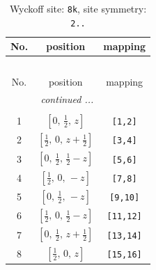 \documentclass[fleqn,8pt]{jsarticle}
\begin{document}
\renewcommand{\arraystretch}{1.2}
\begin{longtable}{ccc}
\caption{Wyckoff site: {\tt 8k}, site symmetry: {\tt 2..}}
 \\
 \hline \hline
No. & position & mapping \\ \hline \endfirsthead

\multicolumn{2}{l}{\tablename\ \thetable{}} \\
 \hline \hline
No. & position & mapping \\ \hline \endhead

 \hline \hline
\multicolumn{2}{r}{\footnotesize\it continued ...} \\ \endfoot

 \hline \hline
\multicolumn{2}{r}{} \\ \endlastfoot

1 & $\left[ 0,\, \frac{1}{2},\, z \right]$ & {\tt [1,2]} \\ \hline
2 & $\left[ \frac{1}{2},\, 0,\, z + \frac{1}{2} \right]$ & {\tt [3,4]} \\ \hline
3 & $\left[ 0,\, \frac{1}{2},\, \frac{1}{2} - z \right]$ & {\tt [5,6]} \\ \hline
4 & $\left[ \frac{1}{2},\, 0,\, - z \right]$ & {\tt [7,8]} \\ \hline
5 & $\left[ 0,\, \frac{1}{2},\, - z \right]$ & {\tt [9,10]} \\ \hline
6 & $\left[ \frac{1}{2},\, 0,\, \frac{1}{2} - z \right]$ & {\tt [11,12]} \\ \hline
7 & $\left[ 0,\, \frac{1}{2},\, z + \frac{1}{2} \right]$ & {\tt [13,14]} \\ \hline
8 & $\left[ \frac{1}{2},\, 0,\, z \right]$ & {\tt [15,16]} \\
\end{longtable}
\renewcommand{\arraystretch}{1.2}
\end{document}
